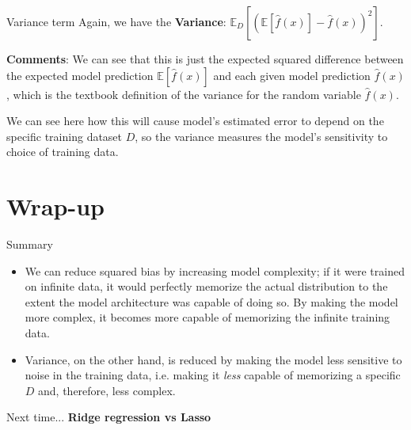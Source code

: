 \documentclass[10pt]{beamer}
\begin{document}
		\begin{frame}{Variance term}
			Again, we have the \textbf{Variance}: $\mathbb{E}_D[(\mathbb{E}[\hat{f}(x)] - \hat{f}(x))^2]$. \vspace{.5cm}
			
			\textbf{Comments}: We can see that this is just the expected squared difference between the expected model prediction $\mathbb{E}[\hat{f}(x)]$ and each given model prediction $\hat{f}(x)$, which is the textbook definition of the variance for the random variable $\hat{f}(x)$. \vspace{.5cm}
			
			We can see here how this will cause model's estimated error to depend on the specific training dataset $D$, so the variance measures the model's sensitivity to choice of training data.
		\end{frame}
		\section{Wrap-up}
		\begin{frame}{Summary}
			\begin{itemize}
				\item We can reduce squared bias by increasing model complexity; if it were trained on infinite data, it would perfectly memorize the actual distribution to the extent the model architecture was capable of doing so. By making the model more complex, it becomes more capable of memorizing the infinite training data.
				\item Variance, on the other hand, is reduced by making the model less sensitive to noise in the training data, i.e. making it \textit{less} capable of memorizing a specific $D$ and, therefore, less complex.
			\end{itemize}
		\end{frame}
	
		\begin{frame}{Next time...}
			\centering
			\textbf{Ridge regression vs Lasso} 
		\end{frame}
	
\end{document}
